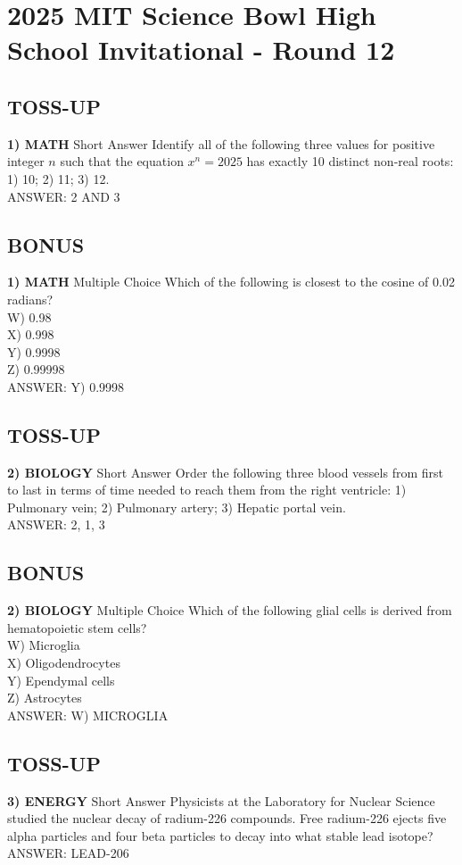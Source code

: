 \documentclass{article}
\begin{document}
\section*{2025 MIT Science Bowl High School Invitational - Round 12}

\subsection*{TOSS-UP}
\textbf{1) MATH} Short Answer Identify all of the following three values for positive integer $n$ such that the equation $x^{n}=2025$ has exactly 10 distinct non-real roots: 1) 10; 2) 11; 3) 12.
\\ANSWER: 2 AND 3

\subsection*{BONUS}
\textbf{1) MATH} Multiple Choice Which of the following is closest to the cosine of 0.02 radians?
\\W) 0.98
\\X) 0.998
\\Y) 0.9998
\\Z) 0.99998
\\ANSWER: Y) 0.9998

\subsection*{TOSS-UP}
\textbf{2) BIOLOGY} Short Answer Order the following three blood vessels from first to last in terms of time needed to reach them from the right ventricle: 1) Pulmonary vein; 2) Pulmonary artery; 3) Hepatic portal vein.
\\ANSWER: 2, 1, 3

\subsection*{BONUS}
\textbf{2) BIOLOGY} Multiple Choice Which of the following glial cells is derived from hematopoietic stem cells?
\\W) Microglia
\\X) Oligodendrocytes
\\Y) Ependymal cells
\\Z) Astrocytes
\\ANSWER: W) MICROGLIA

\subsection*{TOSS-UP}
\textbf{3) ENERGY} Short Answer Physicists at the Laboratory for Nuclear Science studied the nuclear decay of radium-226 compounds. Free radium-226 ejects five alpha particles and four beta particles to decay into what stable lead isotope?
\\ANSWER: LEAD-206
\end{document}
